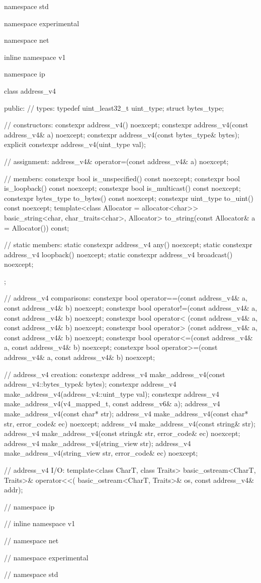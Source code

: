 %
\begin{codeblock}
namespace std {
namespace experimental {
namespace net {
inline namespace v1 {
namespace ip {

  class address_v4
  {
  public:
    // types:
    typedef uint_least32_t uint_type;
    struct bytes_type;

    // constructors:
    constexpr address_v4() noexcept;
    constexpr address_v4(const address_v4& a) noexcept;
    constexpr address_v4(const bytes_type& bytes);
    explicit constexpr address_v4(uint_type val);

    // assignment:
    address_v4& operator=(const address_v4& a) noexcept;

    // members:
    constexpr bool is_unspecified() const noexcept;
    constexpr bool is_loopback() const noexcept;
    constexpr bool is_multicast() const noexcept;
    constexpr bytes_type to_bytes() const noexcept;
    constexpr uint_type to_uint() const noexcept;
    template<class Allocator = allocator<char>>
      basic_string<char, char_traits<char>, Allocator>
        to_string(const Allocator& a = Allocator()) const;

    // static members:
    static constexpr address_v4 any() noexcept;
    static constexpr address_v4 loopback() noexcept;
    static constexpr address_v4 broadcast() noexcept;
  };

  // address_v4 comparisons:
  constexpr bool operator==(const address_v4& a, const address_v4& b) noexcept;
  constexpr bool operator!=(const address_v4& a, const address_v4& b) noexcept;
  constexpr bool operator< (const address_v4& a, const address_v4& b) noexcept;
  constexpr bool operator> (const address_v4& a, const address_v4& b) noexcept;
  constexpr bool operator<=(const address_v4& a, const address_v4& b) noexcept;
  constexpr bool operator>=(const address_v4& a, const address_v4& b) noexcept;

  // address_v4 creation:
  constexpr address_v4 make_address_v4(const address_v4::bytes_type& bytes);
  constexpr address_v4 make_address_v4(address_v4::uint_type val);
  constexpr address_v4 make_address_v4(v4_mapped_t, const address_v6& a);
  address_v4 make_address_v4(const char* str);
  address_v4 make_address_v4(const char* str, error_code& ec) noexcept;
  address_v4 make_address_v4(const string& str);
  address_v4 make_address_v4(const string& str, error_code& ec) noexcept;
  address_v4 make_address_v4(string_view str);
  address_v4 make_address_v4(string_view str, error_code& ec) noexcept;

  // address_v4 I/O:
  template<class CharT, class Traits>
    basic_ostream<CharT, Traits>& operator<<(
      basic_ostream<CharT, Traits>& os, const address_v4& addr);

} // namespace ip
} // inline namespace v1
} // namespace net
} // namespace experimental
} // namespace std
\end{codeblock}

